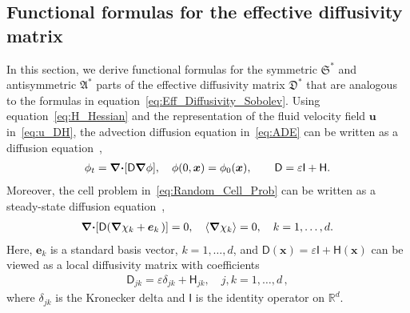 \documentclass[english,12pt,jmp,graphicx]{revtex4-1}
\newcommand{\vecu}{\boldsymbol{u}}
\newcommand{\vecx}{\boldsymbol{x}}
\newcommand{\vece}{\boldsymbol{e}}
\newcommand{\thmref}[1]{Theorem~\ref{#1}}
\newcommand{\secref}[1]{Section~\ref{#1}}
\newcommand{\bnabla}{\mbox{\boldmath${\nabla}$}}
\newcommand{\bcdot}{\mbox{\boldmath${\cdot}$}}
\newcommand{\Vc}{\mathcal{V}}
\newcommand{\Sg}{\mathfrak{S}}
\newcommand{\Ag}{\mathfrak{A}}
\newcommand{\Dg}{\mathfrak{D}}
\newcommand{\Dm}{\mathsf{D}}
\newcommand{\Hm}{\mathsf{H}}
\newcommand{\Hmc}{\mathsf{H}}
\newcommand{\Ib}{\mathsf{I}}
\begin{document}
\subsection{Functional formulas for the effective
  diffusivity matrix} \label{app:Functinals_curl-free} 
%
%
In this section, we derive functional formulas for the symmetric $\Sg^*$ and antisymmetric $\Ag^*$ parts of the effective diffusivity matrix $\Dg^*$ that 
are analogous to the formulas in equation~\eqref{eq:Eff_Diffusivity_Sobolev}. 
Using equation~\eqref{eq:H_Hessian} and the representation of the
fluid velocity field $\vecu$ in~\eqref{eq:u_DH}, the advection diffusion 
equation in~\eqref{eq:ADE} can be written as a diffusion 
equation~\cite{Fannjiang:1994:SIAM_JAM:333,Fannjiang:1997:1033},   
%
\begin{align}\label{eq:ADE_Divergence}
  \phi_t=\bnabla \bcdot[\Dm\bnabla \phi],
  \quad    
    \phi(0,\vecx)=\phi_0(\vecx),
    \qquad
    \Dm=\varepsilon\Ib+\Hm.
\end{align}
%
Moreover, the cell problem in~\eqref{eq:Random_Cell_Prob} can be
written as a steady-state diffusion
equation~\cite{Fannjiang:1994:SIAM_JAM:333,Fannjiang:1997:1033},        
% 
\begin{align}\label{eq:Cell_Problem}
  \bnabla \bcdot[\Dm(\bnabla \chi_k+\vece_k\,)]=0, \quad
  \langle\bnabla\chi_k\rangle=0,
  \quad   k=1,\ldots,d.
\end{align}
%
Here, 
$\vece_k$ is a standard
basis vector, $k=1,\ldots,d$, and
$\Dm(\vecx)=\varepsilon\Ib+\Hm(\vecx)$ can be viewed as a
local diffusivity matrix with coefficients 
% 
\begin{align}\label{eq:kappa_coeff}
  \Dm_{jk}=\varepsilon\delta_{jk}+\Hmc_{jk},\quad j,k=1,\ldots,d\,,
\end{align}
%
where $\delta_{jk}$ is the Kronecker delta and $\Ib$ is the 
identity operator on $\mathbb{R}^d$.    
\end{document}
